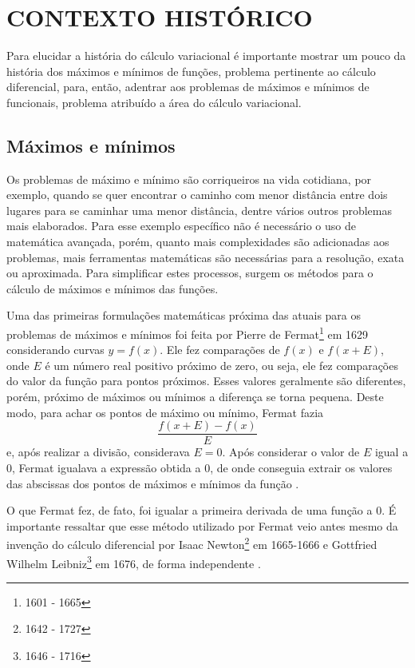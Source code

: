 \documentclass[
	12pt,				%
	openright,			%
    twoside,			%
	a4paper,			%
	chapter=TITLE,		%
	english,			%
	french,				%
	spanish,			%
	brazil				%
	]{abntex2}
\numberwithin{lema}{chapter}
\numberwithin{teorema}{chapter}
\numberwithin{definicao}{chapter}
\numberwithin{exemplo}{chapter}
\numberwithin{figure}{chapter}
\newcommand{\bdDate}[2]{\footnote{\gtrsymBorn\text{ }#1 - \gtrsymDied\text{ }#2}}
\begin{document}
\chapter{CONTEXTO HISTÓRICO}

Para elucidar a história do cálculo variacional é importante mostrar um pouco da história dos máximos e mínimos de funções, problema pertinente ao cálculo diferencial, para, então, adentrar aos problemas de máximos e mínimos de funcionais, problema atribuído a área do cálculo variacional.

\section{Máximos e mínimos}

Os problemas de máximo e mínimo são corriqueiros na vida cotidiana, por exemplo, quando se quer encontrar o caminho com menor distância entre dois lugares para se caminhar uma menor distância, dentre vários outros problemas mais elaborados. Para esse exemplo específico não é necessário o uso de matemática avançada, porém, quanto mais complexidades são adicionadas aos problemas, mais ferramentas matemáticas são necessárias para a resolução, exata ou aproximada. Para simplificar estes processos, surgem os métodos para o cálculo de máximos e mínimos das funções.

Uma das primeiras formulações matemáticas próxima das atuais para os problemas de máximos e mínimos foi feita por Pierre de Fermat\bdDate{1601}{1665} em 1629 considerando curvas $y=f(x)$. Ele fez comparações de $f(x)$ e $f(x+E)$, onde $E$ é um número real positivo próximo de zero, ou seja, ele fez comparações do valor da função para pontos próximos. Esses valores geralmente são diferentes, porém, próximo de máximos ou mínimos a diferença se torna pequena. Deste modo, para achar os pontos de máximo ou mínimo, Fermat fazia
$$
	\frac{f(x+E)-f(x)}{E}
$$
e, após realizar a divisão, considerava $E=0$. Após considerar o valor de $E$ igual a $0$, Fermat igualava a expressão obtida a $0$, de onde conseguia extrair os valores das abscissas dos pontos de máximos e mínimos da função \cite{boyer}.

O que Fermat fez, de fato, foi igualar a primeira derivada de uma função a $0$. É importante ressaltar que esse método utilizado por Fermat veio antes mesmo da invenção do cálculo diferencial por Isaac Newton\bdDate{1642}{1727} em 1665-1666 e Gottfried Wilhelm Leibniz\bdDate{1646}{1716} em 1676, de forma independente \cite{boyer}.
\end{document}
